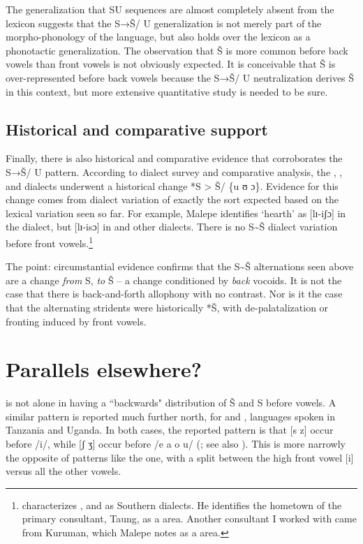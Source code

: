 The generalization that SU sequences are almost completely absent from the lexicon suggests that the S→Š/ {\longrule} U generalization is not merely part of the morpho-phonology of the language, but also holds over the lexicon as a phonotactic generalization. The observation that Š is more common before back vowels than front vowels is not obviously expected. It is conceivable that Š is over-represented before back vowels because the S→Š/ {\longrule} U neutralization derives Š in this context, but more extensive quantitative study is needed to be sure.

\subsection{Historical and comparative support}\label{sec:bennett:2.6}

Finally, there is also historical and comparative evidence that corroborates the S→Š/ {\longrule} U pattern. According to  dialect survey and comparative analysis, the , , and  dialects underwent a historical change *S > Š/ {\longrule} \{u ʊ ɔ\}. Evidence for this change comes from dialect variation of exactly the sort expected based on the lexical variation seen so far. For example, Malepe identifies ‘hearth’ as [lɪ-iʃɔ] in the  dialect, but [lɪ-isɔ] in  and other dialects. There is no S{\textasciitilde}Š dialect variation before front vowels.\footnote{\citet{Malepe1966} characterizes ,  and  as Southern dialects. He identifies the hometown of the primary consultant, Taung, as a  area. Another consultant I worked with came from Kuruman, which Malepe notes as a  area.}

The point: circumstantial evidence confirms that the S{\textasciitilde}Š alternations seen above are a change \textit{from} S, \textit{to} Š – a change conditioned by \textit{back} vocoids. It is not the case that there is back-and-forth allophony with no contrast. Nor is it the case that the alternating stridents were historically *Š, with de-palatalization or fronting induced by front vowels. 

\section{Parallels elsewhere?}\label{sec:bennett:3}

 is not alone in having a ``backwards" distribution of Š and S before vowels. A similar pattern is reported much further north, for  and ,  languages spoken in Tanzania and Uganda. In both cases, the reported pattern is that [s z] occur before /i/, while [ʃ ʒ] occur before /e a o u/ \linebreak (\citealt{Byarushengo1975,Hyman2003b}; see also \citealt{Hansson2001,Hansson2010}). This is more narrowly the opposite of patterns like the  one, with a split between the high front vowel [i] versus all the other vowels.

